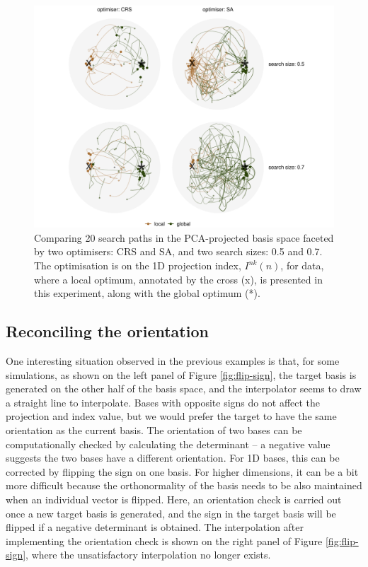 \begin{Schunk}
\begin{figure}

{\centering \includegraphics[width=1\linewidth]{figs/kol-result} 

}

\caption[Comparing 20 search paths in the PCA-projected basis space faceted by two optimisers]{Comparing 20 search paths in the PCA-projected basis space faceted by two optimisers: CRS and SA, and two search sizes: 0.5 and 0.7. The optimisation is on the 1D projection index, $I^{nk}(n)$, for  data, where a local optimum, annotated by the cross (x), is presented in this experiment, along with the global optimum (*).}\label{fig:kol-result}
\end{figure}
\end{Schunk}

\hypertarget{reconciling-the-orientation}{%
\subsection{Reconciling the
orientation}\label{reconciling-the-orientation}}

One interesting situation observed in the previous examples is that, for
some simulations, as shown on the left panel of Figure
\ref{fig:flip-sign}, the target basis is generated on the other half of
the basis space, and the interpolator seems to draw a straight line to
interpolate. Bases with opposite signs do not affect the projection and
index value, but we would prefer the target to have the same orientation
as the current basis. The orientation of two bases can be
computationally checked by calculating the determinant -- a negative
value suggests the two bases have a different orientation. For 1D bases,
this can be corrected by flipping the sign on one basis. For higher
dimensions, it can be a bit more difficult because the orthonormality of
the basis needs to be also maintained when an individual vector is
flipped. Here, an orientation check is carried out once a new target
basis is generated, and the sign in the target basis will be flipped if
a negative determinant is obtained. The interpolation after implementing
the orientation check is shown on the right panel of Figure
\ref{fig:flip-sign}, where the unsatisfactory interpolation no longer
exists.

